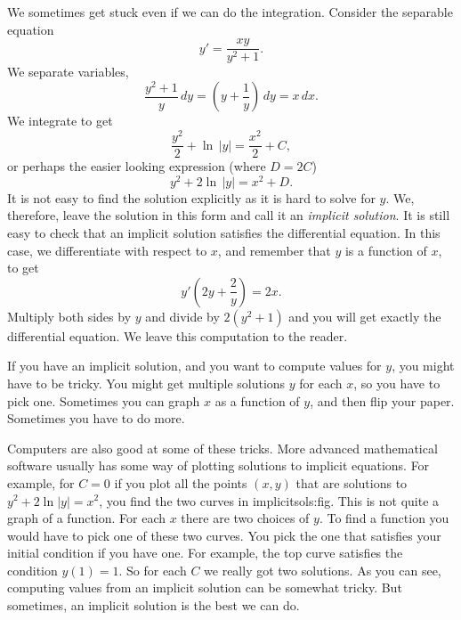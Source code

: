 \documentclass[10pt,aspectratio=169]{beamer}
\begin{document}

\begin{frame}
We sometimes get stuck even if we can do the
integration.  Consider the separable equation
\begin{equation*}
y' = \frac{xy}{y^2+1} .
\end{equation*}
We separate variables,
\begin{equation*}
\frac{y^2+1}{y}\,dy = \left(y+\frac{1}{y}\right)\,dy = x\,dx .
\end{equation*}
We integrate to get
\begin{equation*}
\frac{y^2}{2} + \ln \, \lvert y \rvert = \frac{x^2}{2} + C ,
\end{equation*}
or perhaps the easier looking expression (where $D = 2C$)
\begin{equation*}
y^2 + 2 \ln \, \lvert y\rvert = x^2 + D .
\end{equation*}
It is not easy to find the solution explicitly as it is hard to solve
for $y$.  We, therefore, leave the solution in this form and call
it an
\emph{implicit solution}.
It is still
easy to check that an implicit solution satisfies the differential
equation.  In this case, we differentiate with respect to $x$, and remember
that $y$ is a function of $x$,
to get
\begin{equation*}
y'\left(2y + \frac{2}{y}\right) = 2x .
\end{equation*}
Multiply both sides by $y$ and divide by $2(y^2+1)$ and you will
get exactly the differential equation.  We leave this computation to the
reader.

If you have an implicit solution, and
you want to compute values
for $y$, you might have to be tricky.  You might get multiple solutions $y$
for each $x$, so you have to pick one.  Sometimes you can
graph $x$ as a function of $y$, and then flip your paper.
Sometimes you have to do more.

Computers are also good at some of these tricks.
More advanced mathematical software usually has some
way of plotting solutions to implicit equations.
For example, for $C=0$ if you plot all the points $(x,y)$ that
are solutions to $y^2+2\ln|y|=x^2$,
you find the two curves in {implicitsols:fig}.  This is not quite
a graph of a function. For each $x$ there are two choices of $y$.
To find a function you would have to pick one of these two curves.
You pick the one that satisfies your initial condition if you have one.
For example, the top curve satisfies the condition $y(1)=1$.
So for each $C$ we really got two solutions.
As you can see, computing values from an implicit solution can be somewhat
tricky.  But sometimes, an implicit solution is the best we can do.


\end{frame}
\end{document}

